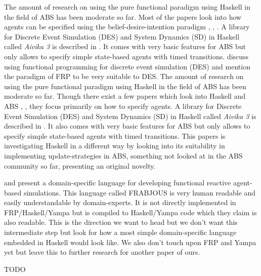 The amount of research on using the pure functional paradigm using Haskell in the field of ABS has been moderate so far. Most of the papers look into how agents can be specified using the belief-desire-intention paradigm \cite{de_jong_suitability_2014}, \cite{sulzmann_specifying_2007}, \cite{jankovic_functional_2007}.
A library for Discrete Event Simulation (DES) and System Dynamics (SD) in Haskell called \textit{Aivika 3} is described in \cite{sorokin_aivika_2015}. It comes with very basic features for ABS but only allows to specify simple state-based agents with timed transitions.
\cite{jankovic_functional_2007} discuss using functional programming for discrete event simulation (DES) and mention the paradigm of FRP to be very suitable to DES.
The amount of research on using the pure functional paradigm using Haskell in the field of ABS has been moderate so far. Though there exist a few papers which look into Haskell and ABS \cite{de_jong_suitability_2014}, \cite{sulzmann_specifying_2007}, \cite{jankovic_functional_2007} they focus primarily on how to specify agents. A library for Discrete Event Simulation (DES) and System Dynamics (SD) in Haskell called \textit{Aivika 3} is described in \cite{sorokin_aivika_2015}. It also comes with very basic features for ABS but only allows to specify simple state-based agents with timed transitions. This papers is investigating Haskell in a different way by looking into its suitability in implementing update-strategies in ABS, something not looked at in the ABS community so far, presenting an original novelty.

\cite{schneider_towards_2012} and \cite{vendrov_frabjous:_2014} present a domain-specific language for developing functional reactive agent-based simulations. This language called FRABJOUS is very human readable and easily understandable by domain-experts. It is not directly implemented in FRP/Haskell/Yampa but is compiled to Haskell/Yampa code which they claim is also readable. This is the direction we want to head but we don't want this intermediate step but look for how a most simple domain-specific language embedded in Haskell would look like. We also don't touch upon FRP and Yampa yet but leave this to further research for another paper of ours.

\cite{klugl_amason:_2013} TODO

